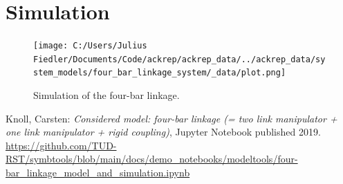 \documentclass[10pt,a4paper]{article}
\begin{document}


\section{Simulation}
\begin{figure}[H]
\centering
\texttt{[image: C:/Users/Julius Fiedler/Documents/Code/ackrep/ackrep\_data/../ackrep\_data/system\_models/four\_bar\_linkage\_system/\_data/plot.png]}
\caption{Simulation of the four-bar linkage.}
\end{figure}
	\begin{thebibliography}{10}
		Knoll, Carsten:
		\textit{Considered model: four-bar linkage (= two link manipulator + one link manipulator + rigid coupling)}, Jupyter Notebook published 2019. \\
		\url{https://github.com/TUD-RST/symbtools/blob/main/docs/demo_notebooks/modeltools/four-bar_linkage_model_and_simulation.ipynb}
	\end{thebibliography}
\end{document}
